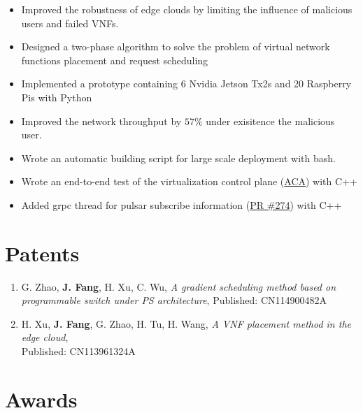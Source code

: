 \documentclass{resume}
\begin{document}
\begin{itemize}
  \item Improved the robustness of edge clouds by limiting the influence of malicious users and failed VNFs.
  \item Designed a two-phase algorithm to solve the problem of virtual network functions placement and request scheduling
  \item Implemented a prototype containing 6 Nvidia Jetson Tx2s and 20 Raspberry Pis with Python
  \item Improved the network throughput by $57\%$ under exisitence the malicious user.
\end{itemize}

\begin{itemize}
  \item Wrote an automatic building script for large scale deployment with bash.
  \item Wrote an end-to-end test of the virtualization control plane (\href{https://github.com/futurewei-cloud/alcor-control-agent}{ACA}) with C++
  \item Added grpc thread for pulsar subscribe information (\href{https://github.com/futurewei-cloud/alcor-control-agent/pull/274}{PR \#274}) with C++
\end{itemize}

\section{Patents}

\begin{enumerate}
  \item G. Zhao, \textbf{J. Fang}, H. Xu, C. Wu, \textit{A gradient scheduling method based on programmable switch under PS architecture}, Published: CN114900482A
  \item H. Xu, \textbf{J. Fang}, G. Zhao, H. Tu, H. Wang, \textit{A VNF placement method in the edge cloud}, \\ Published: CN113961324A
\end{enumerate}

\section{Awards}
\end{document}
